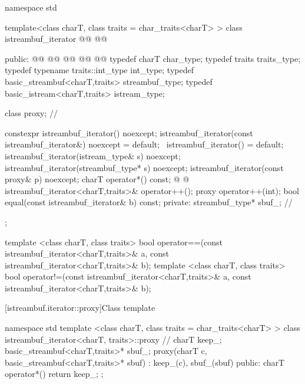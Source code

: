 %
\begin{codeblock}
namespace std {
  template<class charT, class traits = char_traits<charT> >
  class istreambuf_iterator
     @@
                       @@ {
  public:
    @@
    @@
    @@
    @@
    @@
    typedef charT                         char_type;
    typedef traits                        traits_type;
    typedef typename traits::int_type     int_type;
    typedef basic_streambuf<charT,traits> streambuf_type;
    typedef basic_istream<charT,traits>   istream_type;

    class proxy;                          // \expos

    constexpr istreambuf_iterator() noexcept;
    istreambuf_iterator(const istreambuf_iterator&) noexcept = default;
    ~istreambuf_iterator() = default;
    istreambuf_iterator(istream_type& s) noexcept;
    istreambuf_iterator(streambuf_type* s) noexcept;
    istreambuf_iterator(const proxy& p) noexcept;
    charT operator*() const;
    @ @
    istreambuf_iterator<charT,traits>& operator++();
    proxy operator++(int);
    bool equal(const istreambuf_iterator& b) const;
  private:
    streambuf_type* sbuf_;                // \expos
  };

  template <class charT, class traits>
    bool operator==(const istreambuf_iterator<charT,traits>& a,
            const istreambuf_iterator<charT,traits>& b);
  template <class charT, class traits>
    bool operator!=(const istreambuf_iterator<charT,traits>& a,
            const istreambuf_iterator<charT,traits>& b);
}
\end{codeblock}

[istreambuf.iterator::proxy]{Class template }

%
\begin{codeblock}
namespace std {
  template <class charT, class traits = char_traits<charT> >
  class istreambuf_iterator<charT, traits>::proxy { // \expos
    charT keep_;
    basic_streambuf<charT,traits>* sbuf_;
    proxy(charT c, basic_streambuf<charT,traits>* sbuf)
      : keep_(c), sbuf_(sbuf) { }
  public:
    charT operator*() { return keep_; }
  };
}
\end{codeblock}

